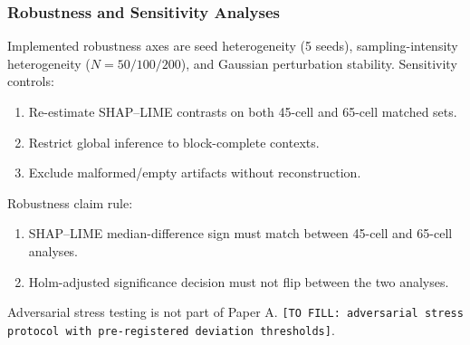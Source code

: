 \documentclass[twoside,11pt]{article}
\begin{document}
\subsubsection{Robustness and Sensitivity Analyses}
Implemented robustness axes are seed heterogeneity (5 seeds), sampling-intensity
heterogeneity ($N=50/100/200$), and Gaussian perturbation stability.
Sensitivity controls:
\begin{enumerate}[leftmargin=*]
    \item Re-estimate SHAP--LIME contrasts on both 45-cell and 65-cell matched sets.
    \item Restrict global inference to block-complete contexts.
    \item Exclude malformed/empty artifacts without reconstruction.
\end{enumerate}
Robustness claim rule:
\begin{enumerate}[leftmargin=*]
    \item SHAP--LIME median-difference sign must match between 45-cell and 65-cell analyses.
    \item Holm-adjusted significance decision must not flip between the two analyses.
\end{enumerate}
Adversarial stress testing is not part of Paper A.
\texttt{[TO FILL: adversarial stress protocol with pre-registered deviation thresholds]}.
\end{document}
